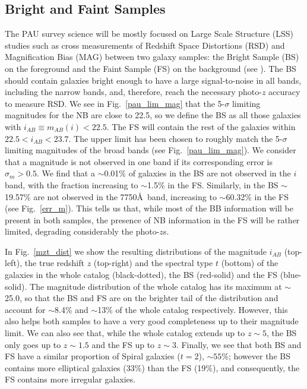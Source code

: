 \subsection{Bright and Faint Samples}
The PAU survey science will be mostly focused on Large Scale Structure (LSS) studies such as cross measurements of Redshift Space Distortions (RSD) and Magnification Bias (MAG) between two galaxy samples: the Bright Sample (BS) on the foreground and the Faint Sample (FS) on the background (see \cite{Gaztanaga2012}). The BS should contain galaxies bright enough to have a large signal-to-noise in all bands, including the narrow bands, and, therefore, reach the necessary photo-$z$ accuracy to measure RSD. 
We see in Fig.~\ref{pau_lim_mag} that the 5-$\sigma$ limiting magnitudes for the NB are close to 22.5, so we define the BS as all those galaxies with $i_{AB} \equiv m_{AB}(i)<22.5$. The FS will contain the rest of the galaxies within $22.5<i_{AB}<23.7$. The upper limit has been chosen to roughly match the 5-$\sigma$ limiting magnitudes of the broad bands (see Fig.~\ref{pau_lim_mag}). 
We consider that a magnitude is not observed in one band if its corresponding error is $\sigma_{m}>0.5$. We find that a $\sim$0.01\% of galaxies in the BS are not observed in the $i$ band, with the fraction increasing to $\sim$1.5\% in the FS. Similarly, in the BS $\sim$19.57\% are not observed in the 7750\AA \ band, increasing to $\sim$60.32\% in the FS (see Fig.~\ref{err_m}). This tells us that, while most of the BB information will be present in both samples, the presence of NB information in the FS will be rather limited, degrading considerably the photo-$z$s. %

In Fig.~\ref{mzt_dist} we show the resulting distributions of the magnitude $i_{AB}$ (top-left), the true redshift $z$ (top-right) and the spectral type $t$ (bottom) of the galaxies in the whole catalog (black-dotted), the BS (red-solid) and the FS (blue-solid). The magnitude distribution of the whole catalog has its maximum at $\sim$25.0, so that the BS and FS are on the brighter tail of the distribution and account for $\sim$8.4\% and $\sim$13\% of the whole catalog respectively. However, this also helps both samples to have a very good completeness up to their magnitude limit. We can also see that, while the whole catalog extends up to $z\sim5$, the BS only goes up to $z\sim1.5$ and the FS up to $z\sim3$. Finally, we see that both BS and FS have a similar proportion of Spiral galaxies ($t=2$), $\sim55$\%; however the BS contains more elliptical galaxies (33\%) than the FS (19\%), and consequently, the FS contains more irregular galaxies. 

